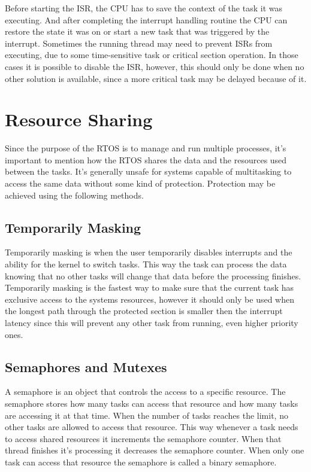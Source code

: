 Before starting the ISR, the CPU has to save the context of the task it was executing. And after completing the interrupt handling routine the CPU can restore the state it was on or start a new task that was triggered by the interrupt. Sometimes the running thread may need to prevent ISRs from executing, due to some time-sensitive task or critical section operation. In those cases it is possible to disable the ISR, however, this should only be done when no other solution is available, since a more critical task may be delayed because of it.





\section{Resource Sharing}
Since the purpose of the RTOS is to manage and run multiple processes, it's important to mention how the RTOS shares the data and the resources used between the tasks. It's generally unsafe for systems capable of multitasking to access the same data without some kind of protection. Protection may be achieved using the following methods.

\subsection{Temporarily Masking}
Temporarily masking is when the user temporarily disables interrupts and the ability for the kernel to switch tasks. This way the task can process the data knowing that no other tasks will change that data before the processing finishes. Temporarily masking is the fastest way to make sure that the current task has exclusive access to the systems resources, however it should only be used when the longest path through the protected section is smaller then the interrupt latency since this will prevent  any other task from running, even higher priority ones.

\subsection{Semaphores and Mutexes}
A semaphore is an object that controls the access to a specific resource. The semaphore stores how many tasks can access that resource and how many tasks are accessing it at that time. When the number of tasks reaches the limit, no other tasks are allowed to access that resource. This way whenever a task needs to access shared resources it increments the semaphore counter. When that thread finishes it's processing it decreases the semaphore counter. When only one task can access that resource the semaphore is called a binary semaphore.

